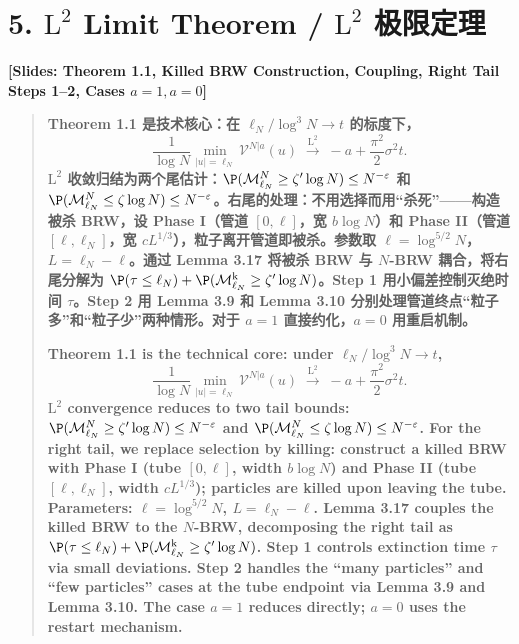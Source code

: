 \documentclass[12pt,a4paper]{article}
\begin{document}
\section*{5. $\mathrm{L}^2$ Limit Theorem / $\mathrm{L}^2$ 极限定理}

\begin{center}
\color{blue!60!black}\textbf{[Slides: Theorem 1.1, Killed BRW Construction, Coupling, Right Tail Steps 1--2, Cases $a=1,a=0$]}
\end{center}

\begin{quote}
\textbf{Theorem 1.1 是技术核心：在 $\ell_N/\log^3 N\to t$ 的标度下，}
\[
\frac{1}{\log N}\min_{|u|=\ell_N}\mathcal V^{N|a}(u)\;\xrightarrow{\mathrm{L}^2}\;-a+\frac{\pi^2}{2}\sigma^2 t.
\]
\textbf{$\mathrm{L}^2$ 收敛归结为两个尾估计：$\P(\mathcal M^N_{\ell_N}\ge \zeta'\log N)\le N^{-\varepsilon}$ 和 $\P(\mathcal M^N_{\ell_N}\le \zeta\log N)\le N^{-\varepsilon}$。右尾的处理：不用选择而用``杀死''——构造被杀 BRW，设 Phase I（管道 $[0,\ell]$，宽 $b\log N$）和 Phase II（管道 $[\ell,\ell_N]$，宽 $cL^{1/3}$），粒子离开管道即被杀。参数取 $\ell=\log^{5/2}N$，$L=\ell_N-\ell$。通过 Lemma 3.17 将被杀 BRW 与 $N$-BRW 耦合，将右尾分解为 $\P(\tau\le\ell_N)+\P(\mathcal M^{\mathrm{k}}_{\ell_N}\ge \zeta'\log N)$。Step 1 用小偏差控制灭绝时间 $\tau$。Step 2 用 Lemma 3.9 和 Lemma 3.10 分别处理管道终点``粒子多''和``粒子少''两种情形。对于 $a=1$ 直接约化，$a=0$ 用重启机制。}

\bigskip

\textbf{Theorem 1.1 is the technical core: under $\ell_N/\log^3 N\to t$,}
\[
\frac{1}{\log N}\min_{|u|=\ell_N}\mathcal V^{N|a}(u)\;\xrightarrow{\mathrm{L}^2}\;-a+\frac{\pi^2}{2}\sigma^2 t.
\]
\textbf{$\mathrm{L}^2$ convergence reduces to two tail bounds: $\P(\mathcal M^N_{\ell_N}\ge \zeta'\log N)\le N^{-\varepsilon}$ and $\P(\mathcal M^N_{\ell_N}\le \zeta\log N)\le N^{-\varepsilon}$. For the right tail, we replace selection by killing: construct a killed BRW with Phase I (tube $[0,\ell]$, width $b\log N$) and Phase II (tube $[\ell,\ell_N]$, width $cL^{1/3}$); particles are killed upon leaving the tube. Parameters: $\ell=\log^{5/2}N$, $L=\ell_N-\ell$. Lemma 3.17 couples the killed BRW to the $N$-BRW, decomposing the right tail as $\P(\tau\le\ell_N)+\P(\mathcal M^{\mathrm{k}}_{\ell_N}\ge \zeta'\log N)$. Step 1 controls extinction time $\tau$ via small deviations. Step 2 handles the ``many particles'' and ``few particles'' cases at the tube endpoint via Lemma 3.9 and Lemma 3.10. The case $a=1$ reduces directly; $a=0$ uses the restart mechanism.}
\end{quote}
\end{document}
